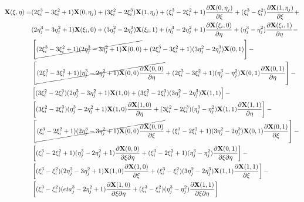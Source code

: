 \documentclass[10pt]{article}
\begin{document}
\begin{equation}
\begin{aligned}
\textbf{X}(\xi,\eta)=& (2\xi_i^3-3\xi_i^2+1)\textbf{X}(0,\eta_j)+(3\xi_i^2-2\xi_i^3)\textbf{X}(1,\eta_j)+(\xi_i^3-2\xi_i^2+1)\frac{\partial\textbf{X}(0,\eta_j)}{\partial\xi}+(\xi_i^3-\xi_i^2)\frac{\partial\textbf{X}(1,\eta_j)}{\partial\xi}+\\
& (2\eta_j^3-3\eta_j^2+1)\textbf{X}(\xi_i,0)+(3\eta_j^2-2\eta_j^3)\textbf{X}(\xi_i,1)+(\eta_j^3-2\eta_j^2+1)\frac{\partial\textbf{X}(\xi_i,0)}{\partial\eta}+(\eta_j^3-\eta_j^2)\frac{\partial\textbf{X}(\xi_i,1)}{\partial\eta}-\\
& \left\lbrack\cancel{(2\xi_i^3-3\xi_i^2+1)(2\eta_j^3-3\eta_j^2+1)\textbf{X}(0,0)}+(2\xi_i^3-3\xi_i^2+1)(3\eta_j^2-2\eta_j^3)\textbf{X}(0,1)\right\rbrack-\\
& \left\lbrack\cancel{(2\xi_i^3-3\xi_i^2+1)(\eta_j^3-2\eta_j^2+1)\textbf{X}(0,0)\frac{\partial\textbf{X}(0,0)}{\partial\eta}}+(2\xi_i^3-3\xi_i^2+1)(\eta_j^3-\eta_j^2)\textbf{X}(0,1)\frac{\partial\textbf{X}(0,1)}{\partial\eta}\right\rbrack-\\
& \left\lbrack(3\xi_i^2-2\xi_i^3)(2\eta_j^3-3\eta_j^2+1)\textbf{X}(1,0)+(3\xi_i^2-2\xi_i^3)(3\eta_j^2-2\eta_j^3)\textbf{X}(1,1)\right\rbrack-\\
& \left\lbrack(3\xi_i^2-2\xi_i^3)(\eta_j^3-2\eta_j^2+1)\textbf{X}(1,0)\frac{\partial\textbf{X}(1,0)}{\partial\eta}+(3\xi_i^2-2\xi_i^3)(\eta_j^3-\eta_j^2)\textbf{X}(1,1)\frac{\partial\textbf{X}(1,1)}{\partial\eta}\right\rbrack-\\
& \left\lbrack\cancel{(\xi_i^3-2\xi_i^2+1)(2\eta_j^3-3\eta_j^2+1)\textbf{X}(0,0)\frac{\partial\textbf{X}(0,0)}{\partial\xi}}+(\xi_i^3-2\xi_i^2+1)(3\eta_j^2-2\eta_j^3)\textbf{X}(0,1)\frac{\partial\textbf{X}(0,1)}{\partial\xi}\right\rbrack-\\
& \left\lbrack(\xi_i^3-2\xi_i^2+1)(\eta_j^3-2\eta_j^2+1)\frac{\partial\textbf{X}(0,0)}{\partial\xi\partial\eta}+(\xi_i^3-2\xi_i^2+1)(\eta_j^3-\eta_j^2)\frac{\partial\textbf{X}(0,1)}{\partial\xi\partial\eta}\right\rbrack-\\
& \left\lbrack(\xi_i^3-\xi_i^2)(2\eta_j^3-3\eta_j^2+1)\textbf{X}(1,0)\frac{\partial\textbf{X}(1,0)}{\partial\xi}+(\xi_i^3-\xi_i^2)(3\eta_j^2-2\eta_j^3)\textbf{X}(1,1)\frac{\partial\textbf{X}(1,1)}{\partial\xi}\right\rbrack-\\
& \left\lbrack(\xi_i^3-\xi_i^2)(eta_j^3-2\eta_j^2+1)\frac{\partial\textbf{X}(1,0)}{\partial\xi\partial\eta}+(\xi_i^3-\xi_i^2)(\eta_j^3-\eta_j^2)\frac{\partial\textbf{X}(1,1)}{\partial\xi\partial\eta}\right\rbrack
\end{aligned}
\end{equation}
\end{document}
